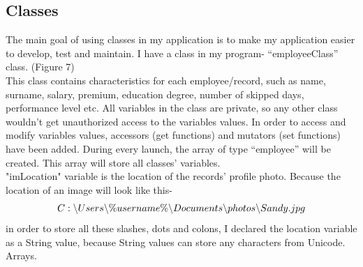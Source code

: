 \documentclass[a4]{article}
\begin{document}
\subsection{Classes}

The main goal of using classes in my application is to make my application easier to develop, test and maintain. I have a class in my program- “employeeClass” class. (Figure 7)\\

This class contains characteristics for each employee/record, such as name, surname, salary, premium, education degree, number of skipped days, performance level etc. All variables in the class are private, so any other class wouldn’t get unauthorized access to the variables values. In order to access and modify variables values, accessors (get functions) and mutators (set functions) have been added.  During every launch, the array of type “employee” will be created. This array will store all classes’ variables.\\

"imLocation" variable is the location of the records’ profile photo. Because the location of an image will look like this-\\
\begin{equation*}
    C: \backslash Users \backslash \%username\% \backslash Documents \backslash photos \backslash Sandy.jpg\\
\end{equation*}
in order to store all these slashes, dots and colons, I declared the location variable as a String value, because String values can store any characters from Unicode. 
Arrays.\\
\end{document}
